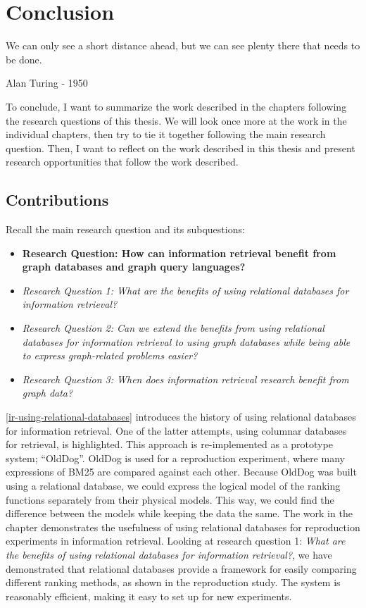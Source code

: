 \chapter{Conclusion}
\label{conclusion}
\epigraph{We can only see a short distance ahead, but we can see plenty there that needs to be done.}{Alan Turing - 1950}

To conclude, I want to summarize the work described in the chapters following the research questions of this thesis. We will look once more at the work in the individual chapters, then try to tie it together following the main research question. Then, I want to reflect on the work described in this thesis and present research opportunities that follow the work described. 

\section{Contributions}
Recall the main research question and its subquestions:
\begin{itemize}
	\item \textbf{Research Question: How can information retrieval benefit from graph databases and graph query languages?}
	\item \emph{Research Question 1: What are the benefits of using relational databases for information retrieval?} 
	\item \emph{Research Question 2: Can we extend the benefits from using relational databases for information retrieval to using graph databases while being able to express graph-related problems easier?} 
	\item \emph{Research Question 3: When does information retrieval research benefit from graph data?} 
\end{itemize}

\cref{ir-using-relational-databases} introduces the history of using relational databases for information retrieval. One of the latter attempts, using columnar databases for retrieval, is highlighted. This approach is re-implemented as a prototype system; ``OldDog''. OldDog is used for a reproduction experiment, where many expressions of BM25 are compared against each other. Because OldDog was built using a relational database, we could express the logical model of the ranking functions separately from their physical models. This way, we could find the difference between the models while keeping the data the same. The work in the chapter demonstrates the usefulness of using relational databases for reproduction experiments in information retrieval. Looking at research question 1: \emph{What are the benefits of using relational databases for information retrieval?}, we have demonstrated that relational databases provide a framework for easily comparing different ranking methods, as shown in the reproduction study. The system is reasonably efficient, making it easy to set up for new experiments. 

